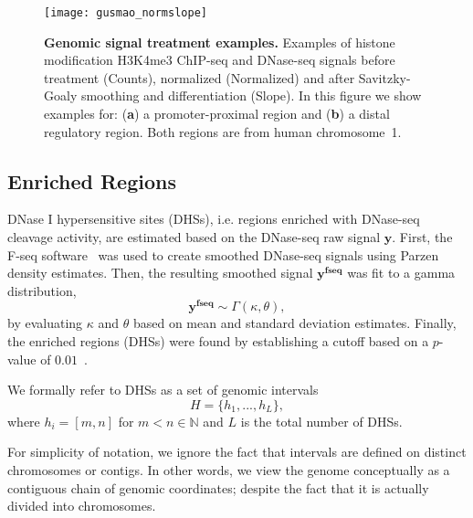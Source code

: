 \begin{figure}[h!]
\centering
\texttt{[image: gusmao\_normslope]}
\caption[Genomic signal treatment examples]{\textbf{Genomic signal treatment examples.} Examples of histone modification H3K4me3 ChIP-seq and DNase-seq signals before treatment (Counts), normalized (Normalized) and after Savitzky-Goaly smoothing and differentiation (Slope). In this figure we show examples for: (\textbf{a}) a promoter-proximal region and (\textbf{b}) a distal regulatory region. Both regions are from human chromosome~1.}
\label{fig:gusmao_normslope}
\end{figure}

\subsection{Enriched Regions}
\label{sec:enriched.regions}





DNase I hypersensitive sites (DHSs), i.e. regions enriched with DNase-seq cleavage activity, are estimated based on the DNase-seq raw signal $\mathbf{y}$. First, the F-seq software~\cite{boyle2008b} was used to create smoothed DNase-seq signals using Parzen density estimates. Then, the resulting smoothed signal $\mathbf{y^\text{fseq}}$ was fit to a gamma distribution,
\begin{equation}
  \label{eq:gamma}
  \mathbf{y^\text{fseq}} \sim \Gamma(\kappa,\theta),
\end{equation}
by evaluating $\kappa$ and $\theta$ based on mean and standard deviation estimates. Finally, the enriched regions (DHSs) were found by establishing a cutoff based on a $p$-value of $0.01$~\cite{boyle2008b,encode2012}.

We formally refer to DHSs as a set of genomic intervals
\begin{equation}
  \label{eq:dhs.set}
  H = \{{h}_{1}, ..., {h}_{L}\},
\end{equation}
where ${h}_{i} = [m,n]$ for $m<n \in \mathbb{N}$ and $L$ is the total number of DHSs. 

For simplicity of notation, we ignore the fact that intervals are defined on distinct chromosomes or contigs. In other words, we view the genome conceptually as a contiguous chain of genomic coordinates; despite the fact that it is actually divided into chromosomes.



